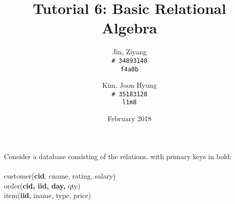 \documentclass{article}
\title{Tutorial 6: Basic Relational Algebra}
\author{
	Jin, Ziyang\\
	\texttt{\# 34893140}\\
	\texttt{f4a0b}
	\and
	Kim, Joon Hyung\\
	\texttt{\# 35183128}\\
	\texttt{l1m8}
}
\date{February 2018}
\begin{document}
	\maketitle

\noindent Consider a database consisting of the relations, with primary keys in bold:\\
\\
customer(\textbf{cid}, cname, rating, salary)\\
order(\textbf{cid, iid, day,} qty)\\
item(\textbf{iid}, iname, type, price)\\
\\
\end{document}
